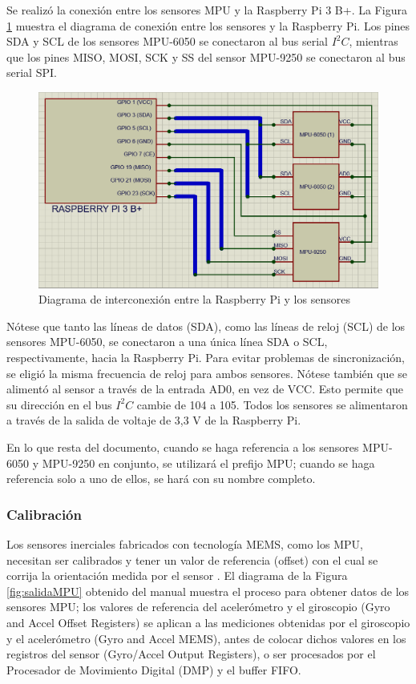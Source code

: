 \documentclass[12pt, twoside]{report}
\begin{document}
Se realizó la conexión entre los sensores MPU y la Raspberry Pi 3 B+. La Figura \ref{fig:diagrama} muestra el diagrama de conexión entre los sensores y la Raspberry Pi. Los pines SDA y SCL de los sensores MPU-6050 se conectaron al bus serial $I^2C$, mientras que los pines MISO, MOSI, SCK y SS del sensor MPU-9250 se conectaron al bus serial SPI.

\begin{figure}[htb]
	\centering
	\includegraphics[scale=0.6]{diagrama.png}
	\caption{Diagrama de interconexión entre la Raspberry Pi y los sensores}
	\label{fig:diagrama}
\end{figure}

Nótese que tanto las líneas de datos (SDA), como las líneas de reloj (SCL) de los sensores MPU-6050, se conectaron a una única línea SDA o SCL, respectivamente, hacia la Raspberry Pi. Para evitar problemas de sincronización, se eligió la misma frecuencia de reloj para ambos sensores. Nótese también que se alimentó al sensor a través de la entrada AD0, en vez de VCC. Esto permite que su dirección en el bus $I^2C$ cambie de 104 a 105. Todos los sensores se alimentaron a través de la salida de voltaje de 3,3 V de la Raspberry Pi.

En lo que resta del documento, cuando se haga referencia a los sensores MPU-6050 y MPU-9250 en conjunto, se utilizará el prefijo MPU; cuando se haga referencia solo a uno de ellos, se hará con su nombre completo.

\subsubsection{Calibración}

Los sensores inerciales fabricados con tecnología MEMS, como los MPU, necesitan ser calibrados y tener un valor de referencia (offset) con el cual se corrija la orientación medida por el sensor \cite{offsetMPU}. El diagrama de la Figura \ref{fig:salidaMPU} obtenido del manual \cite{offsetMPU} muestra el proceso para obtener datos de los sensores MPU; los valores de referencia del acelerómetro y el giroscopio (Gyro and Accel Offset Registers) se aplican a las mediciones obtenidas por el giroscopio y el acelerómetro (Gyro and Accel MEMS), antes de colocar dichos valores en los registros del sensor (Gyro/Accel Output Registers), o ser procesados por el Procesador de Movimiento Digital (DMP) y el buffer FIFO.
\end{document}
